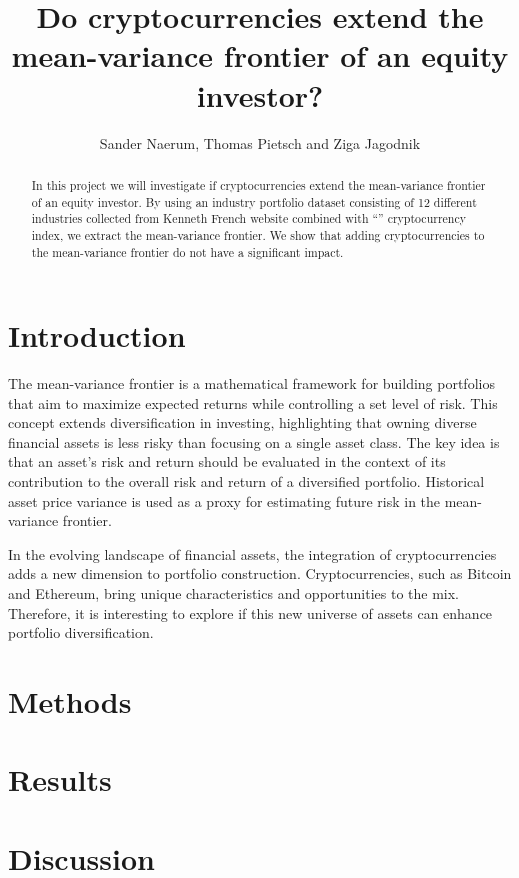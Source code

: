 \documentclass[12pt,a4paper]{article}
\title{Do cryptocurrencies extend the mean-variance frontier of an equity investor?}
\author{Sander Naerum, Thomas Pietsch and Ziga Jagodnik}
\begin{document}
\maketitle

\begin{abstract}
In this project we will investigate if cryptocurrencies extend the mean-variance frontier of an equity investor. 
By using an industry portfolio dataset consisting of 12 different industries collected from Kenneth French website 
combined with “” cryptocurrency index, we extract the mean-variance frontier. We show that adding cryptocurrencies to 
the mean-variance frontier do not have a significant impact.  
\end{abstract}

\section{Introduction}\label{sec:intro}
The mean-variance frontier is a mathematical framework for building portfolios that aim to maximize expected returns 
while controlling a set level of risk. This concept extends diversification in investing, highlighting that owning 
diverse financial assets is less risky than focusing on a single asset class. The key idea is that an asset's risk and 
return should be evaluated in the context of its contribution to the overall risk and return of a diversified portfolio. 
Historical asset price variance is used as a proxy for estimating future risk in the mean-variance frontier.

In the evolving landscape of financial assets, the integration of cryptocurrencies adds a new dimension to portfolio 
construction. Cryptocurrencies, such as Bitcoin and Ethereum, bring unique characteristics and opportunities to the mix. 
Therefore, it is interesting to explore if this new universe of assets can enhance portfolio diversification. 

\section{Methods}\label{sec:methods}

\section{Results}\label{sec:result}

\section{Discussion}\label{sec:discussion}
\end{document}
